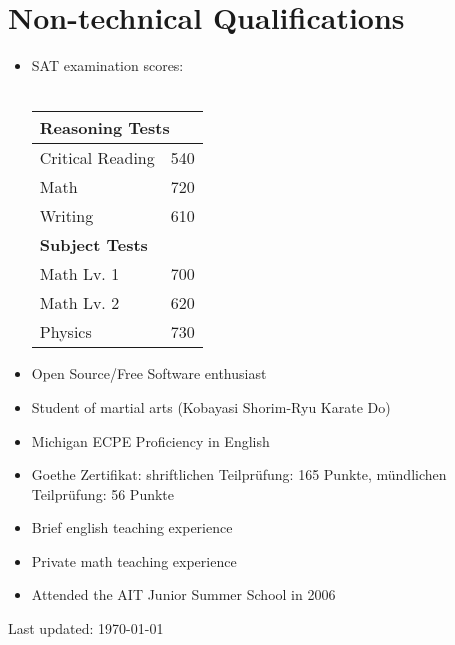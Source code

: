 \documentclass[letterpaper]{article}
\begin{document}
\section*{Non-technical Qualifications}

\begin{itemize}
\item SAT examination scores: \\ \\
  \indent
  \begin{tabular}{|l|c|}
    \hline
    \multicolumn{2}{|l|}{\bf Reasoning Tests} \\
    \hline
    Critical Reading & 540 \\
    \hline
    Math & 720 \\
    \hline
    Writing & 610 \\
    \hline
    \multicolumn{2}{|l|}{\bf Subject Tests}\\
    \hline
    Math Lv. 1 & 700 \\
    \hline
    Math Lv. 2 & 620 \\
    \hline
    Physics & 730 \\
    \hline
  \end{tabular}
\item Open Source/Free Software enthusiast
\item Student of martial arts (Kobayasi Shorim-Ryu Karate Do)
\item Michigan ECPE Proficiency in English
\item Goethe Zertifikat: shriftlichen Teilpr\"{u}fung: 165 Punkte, m\"{u}ndlichen Teilpr\"{u}fung: 56 Punkte
\item Brief english teaching experience
\item Private math teaching experience
\item Attended the AIT Junior Summer School in 2006
\end{itemize}

\vfill

\begin{center}
  \begin{footnotesize}
    Last updated: \today
  \end{footnotesize}
\end{center}
\end{document}
